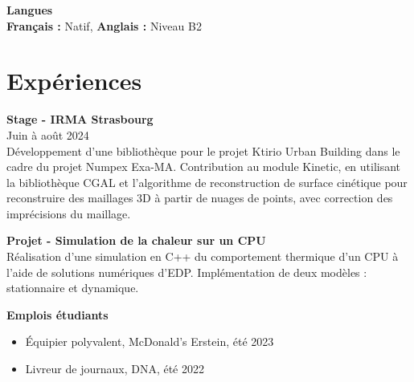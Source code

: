 \documentclass[a4paper,10pt]{article}
\begin{document}
\vspace{0.1cm}

\noindent
\textbf{Langues} \\
\textbf{Français :} Natif, \textbf{Anglais :} Niveau B2


\vspace{0.2cm}

\section*{Expériences}
\noindent
\textbf{Stage - IRMA Strasbourg} \\
Juin à août 2024 \\
Développement d'une bibliothèque pour le projet Ktirio Urban Building dans le cadre du projet Numpex Exa-MA. Contribution au module Kinetic, en utilisant la bibliothèque CGAL et l'algorithme de reconstruction de surface cinétique pour reconstruire des maillages 3D à partir de nuages de points, avec correction des imprécisions du maillage. \\

\vspace{0.3cm}

\noindent
\textbf{Projet - Simulation de la chaleur sur un CPU} \\
Réalisation d'une simulation en C++ du comportement thermique d'un CPU à l'aide de solutions numériques d'EDP. Implémentation de deux modèles : stationnaire et dynamique. \\

\vspace{0.3cm}

\noindent
\textbf{Emplois étudiants}
\begin{itemize}
    \item Équipier polyvalent, McDonald's Erstein, été 2023
    \item Livreur de journaux, DNA, été 2022
\end{itemize}
\end{document}
